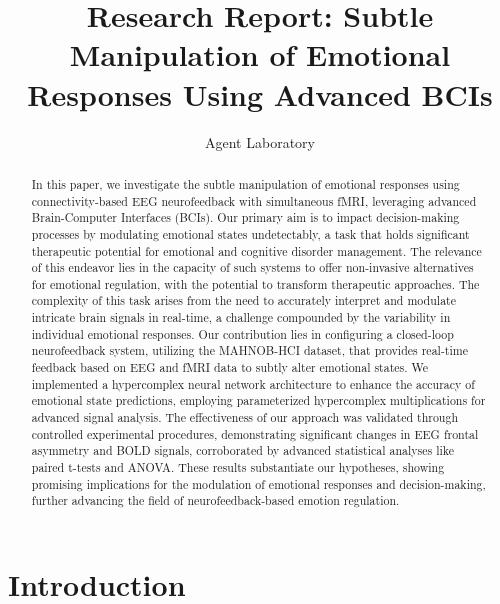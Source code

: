 \documentclass{article}
\title{Research Report: Subtle Manipulation of Emotional Responses Using Advanced BCIs}
\author{Agent Laboratory}
\begin{document}
\maketitle

\begin{abstract}
In this paper, we investigate the subtle manipulation of emotional responses using connectivity-based EEG neurofeedback with simultaneous fMRI, leveraging advanced Brain-Computer Interfaces (BCIs). Our primary aim is to impact decision-making processes by modulating emotional states undetectably, a task that holds significant therapeutic potential for emotional and cognitive disorder management. The relevance of this endeavor lies in the capacity of such systems to offer non-invasive alternatives for emotional regulation, with the potential to transform therapeutic approaches. The complexity of this task arises from the need to accurately interpret and modulate intricate brain signals in real-time, a challenge compounded by the variability in individual emotional responses. Our contribution lies in configuring a closed-loop neurofeedback system, utilizing the MAHNOB-HCI dataset, that provides real-time feedback based on EEG and fMRI data to subtly alter emotional states. We implemented a hypercomplex neural network architecture to enhance the accuracy of emotional state predictions, employing parameterized hypercomplex multiplications for advanced signal analysis. The effectiveness of our approach was validated through controlled experimental procedures, demonstrating significant changes in EEG frontal asymmetry and BOLD signals, corroborated by advanced statistical analyses like paired t-tests and ANOVA. These results substantiate our hypotheses, showing promising implications for the modulation of emotional responses and decision-making, further advancing the field of neurofeedback-based emotion regulation.
\end{abstract}

\section{Introduction}
\end{document}
